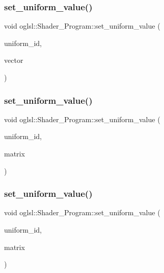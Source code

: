 \subsubsection{\texorpdfstring{set\+\_\+uniform\+\_\+value()}{set\_uniform\_value()}\hspace{0.1cm}{\footnotesize\ttfamily [5/8]}}
{\footnotesize\ttfamily void oglsl\+::\+Shader\+\_\+\+Program\+::set\+\_\+uniform\+\_\+value (\begin{DoxyParamCaption}\item[{G\+Lint}]{uniform\+\_\+id,  }\item[{const Vector4f \&}]{vector }\end{DoxyParamCaption})\hspace{0.3cm}{\ttfamily [inline]}}

\mbox{\label{classoglsl_1_1_shader___program_a664e80fef5a7c5941c79aff725fee938}} 
\subsubsection{\texorpdfstring{set\+\_\+uniform\+\_\+value()}{set\_uniform\_value()}\hspace{0.1cm}{\footnotesize\ttfamily [6/8]}}
{\footnotesize\ttfamily void oglsl\+::\+Shader\+\_\+\+Program\+::set\+\_\+uniform\+\_\+value (\begin{DoxyParamCaption}\item[{G\+Lint}]{uniform\+\_\+id,  }\item[{const Matrix22f \&}]{matrix }\end{DoxyParamCaption})\hspace{0.3cm}{\ttfamily [inline]}}

\mbox{\label{classoglsl_1_1_shader___program_a1504c5005186747a2311cf54ca1c1578}} 
\subsubsection{\texorpdfstring{set\+\_\+uniform\+\_\+value()}{set\_uniform\_value()}\hspace{0.1cm}{\footnotesize\ttfamily [7/8]}}
{\footnotesize\ttfamily void oglsl\+::\+Shader\+\_\+\+Program\+::set\+\_\+uniform\+\_\+value (\begin{DoxyParamCaption}\item[{G\+Lint}]{uniform\+\_\+id,  }\item[{const Matrix33f \&}]{matrix }\end{DoxyParamCaption})\hspace{0.3cm}{\ttfamily [inline]}}

